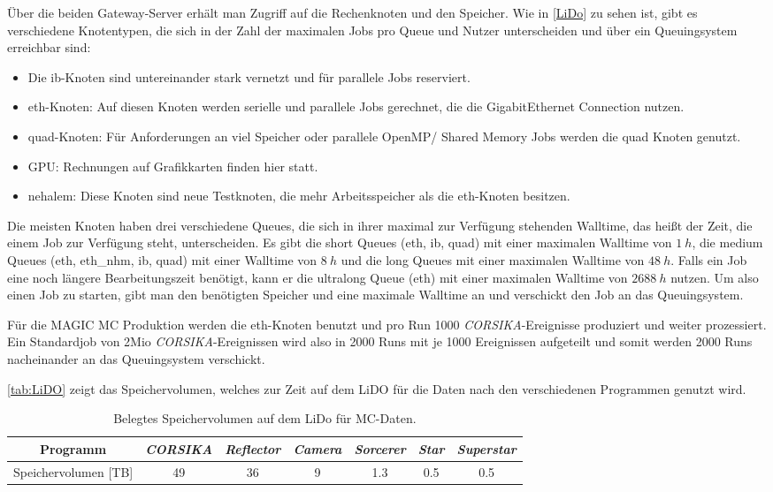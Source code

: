 Über die beiden Gateway-Server erhält man Zugriff auf die Rechenknoten und den Speicher.
Wie in \autoref{LiDo} zu sehen ist, gibt es verschiedene Knotentypen, die sich in der Zahl der maximalen Jobs pro Queue und Nutzer unterscheiden und über ein Queuingsystem erreichbar sind:

\begin{itemize}
 \item Die ib-Knoten sind untereinander stark vernetzt und für parallele Jobs reserviert.
 \item eth-Knoten: Auf diesen Knoten werden serielle und parallele Jobs gerechnet, die die GigabitEthernet Connection nutzen.
 \item quad-Knoten: Für Anforderungen an viel Speicher oder parallele OpenMP/ Shared Memory Jobs werden die quad Knoten genutzt.
 \item GPU: Rechnungen auf Grafikkarten finden hier statt.
 \item nehalem: Diese Knoten sind neue Testknoten, die mehr Arbeitsspeicher als die eth-Knoten besitzen.
\end{itemize}

Die meisten Knoten haben drei verschiedene Queues, die sich in ihrer maximal zur Verfügung stehenden Walltime, das heißt der Zeit, die einem Job zur Verfügung steht, unterscheiden.
Es gibt die short Queues (eth, ib, quad) mit einer maximalen Walltime von $\SI{1}{h}$, die medium Queues (eth, eth\_nhm, ib, quad) mit einer Walltime von $\SI{8}{h}$ und die long Queues mit einer maximalen Walltime von $\SI{48}{h}$. 
Falls ein Job eine noch längere Bearbeitungszeit benötigt, kann er die ultralong Queue (eth) mit einer maximalen Walltime von $\SI{2688}{h}$ nutzen.
Um also einen Job zu starten, gibt man den benötigten Speicher und eine maximale Walltime an und verschickt den Job an das Queuingsystem.

Für die MAGIC MC Produktion werden die eth-Knoten benutzt und pro Run 1000 \textit{CORSIKA}-Ereignisse produziert und weiter prozessiert. 
Ein Standardjob von 2Mio \textit{CORSIKA}-Ereignissen wird also in 2000 Runs mit je 1000 Ereignissen aufgeteilt und somit werden 2000 Runs nacheinander an das Queuingsystem verschickt.


\autoref{tab:LiDO} zeigt das Speichervolumen, welches zur Zeit auf dem LiDO für die Daten nach den verschiedenen Programmen genutzt wird.

\begin{table}[h!]
    \centering
    \caption{Belegtes Speichervolumen auf dem LiDo für MC-Daten.}
    \label{tab:LiDO}
    \begin{tabular}{ccccccc}
        \toprule
        Programm & \textit{CORSIKA} & \textit{Reflector} & \textit{Camera} & \textit{Sorcerer} & \textit{Star} & \textit{Superstar}\\
        \midrule
        Speichervolumen [TB] & 49 & 36 & 9 & 1.3 & 0.5 & 0.5\\
        \bottomrule
    \end{tabular}
\end{table}

